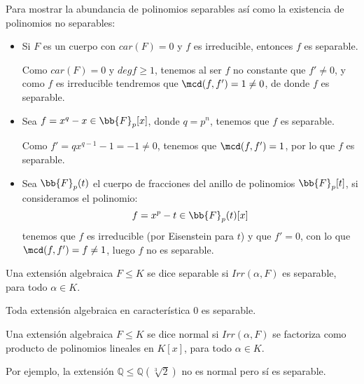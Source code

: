 \begin{ejemplo}
    Para mostrar la abundancia de polinomios separables así como la existencia de polinomios no separables:
    \begin{itemize}
        \item Si $F$ es un cuerpo con $car(F)= 0$ y $f$ es irreducible, entonces $f$ es separable.

            Como $car(F)=0$ y $degf\geq 1$, tenemos al ser $f$ no constante que $f'\neq 0$, y como $f$ es irreducible tendremos que $\mcd(f,f')=1\neq 0$, de donde $f$ es separable.
        \item Sea $f=x^q-x\in \bb{F}_p[x]$, donde $q=p^n$, tenemos que $f$ es separable.

            Como $f'=qx^{q-1}-1 = -1\neq 0$, tenemos que $\mcd(f,f')=1$, por lo que $f$ es separable.
        \item Sea $\bb{F}_p(t)$ el cuerpo de fracciones del anillo de polinomios $\bb{F}_p[t]$, si consideramos el polinomio:
            \begin{equation*}
                f = x^p-t\in \bb{F}_p(t)[x]
            \end{equation*}
            tenemos que $f$ es irreducible (por Eisenstein para $t$) y que $f'=0$, con lo que $\mcd(f,f')=f\neq 1$, luego $f$ no es separable.
    \end{itemize}
\end{ejemplo}

\begin{definicion}
    Una extensión algebraica $F\leq K$ se dice separable si $Irr(\alpha,F)$ es separable, para todo $\alpha\in K$.
\end{definicion}

\begin{observacion}
    Toda extensión algebraica en característica $0$ es separable.
\end{observacion}

\begin{definicion}
    Una extensión algebraica $F\leq K$ se dice normal si $Irr(\alpha,F)$ se factoriza como producto de polinomios lineales en $K[x]$, para todo $\alpha\in K$.
\end{definicion}

\begin{ejemplo}
    Por ejemplo, la extensión $\mathbb{Q}\leq \mathbb{Q}(\sqrt[3]{2})$ no es normal pero sí es separable.
\end{ejemplo}

